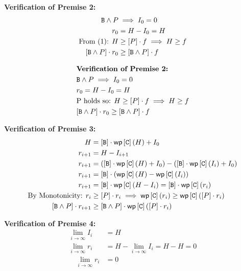 \documentclass[acmsmall,natbib,review,screen,anonymous,10pt]{acmart}
\begin{document}
\noindent\textbf{Verification of Premise 2:}
\begin{align*}
  \mathtt{B} \wedge P &\implies I_0 = 0 \\
  r_0 &= H - I_0 = H \\
  \text{From (1): } H &\geq [P] \cdot f \implies H \geq f \\
  \quad [\mathtt{B}\land P] \cdot r_0 &\geq [\mathtt{B}\land P] \cdot f
\end{align*}

$$\begin{aligned}
& \textbf{Verification of Premise 2:} \\
& \mathtt{B} \wedge P \implies I_0 = 0 \\
& r_0 = H - I_0 = H \\
& \text{P holds so: } H \ge [P] \cdot f \implies H \ge f \\
& [\mathtt{B} \wedge P] \cdot r_0 \ge [\mathtt{B} \wedge P] \cdot f
\end{aligned}$$

\noindent\textbf{Verification of Premise 3:}
\begin{align*}
  H &= [\mathtt{B}] \cdot \mathsf{wp}\left[{\mathtt{C}}\right]\left({H}\right) + I_0 \\
  r_{i+1} &= H - I_{i+1} \\
  r_{i+1} &= ([\mathtt{B}] \cdot \mathsf{wp}\left[{\mathtt{C}}\right]\left({H}\right) + I_0) - ([\mathtt{B}] \cdot \mathsf{wp}\left[{\mathtt{C}}\right]\left({I_i}\right) + I_0) \\
  r_{i+1} &= [\mathtt{B}] \cdot (\mathsf{wp}\left[{\mathtt{C}}\right]\left({H}\right) - \mathsf{wp}\left[{\mathtt{C}}\right]\left({I_i}\right)) \\
  r_{i+1} &= [\mathtt{B}] \cdot \mathsf{wp}\left[{\mathtt{C}}\right]\left({H - I_i}\right) = [\mathtt{B}] \cdot \mathsf{wp}\left[{\mathtt{C}}\right]\left({r_i}\right) \\
  \text{By Monotonicity: } r_i &\geq [P] \cdot r_i \implies \mathsf{wp}\left[{\mathtt{C}}\right]\left({r_i}\right) \geq \mathsf{wp}\left[{\mathtt{C}}\right]\left({[P] \cdot r_i}\right) \\
  \quad [\mathtt{B}\land P] \cdot r_{i+1} &\geq [\mathtt{B}\land P] \cdot \mathsf{wp}\left[{\mathtt{C}}\right]\left({[P] \cdot r_i}\right)
\end{align*}

\noindent\textbf{Verification of Premise 4:}
\begin{align*}
  \lim_{i \to \infty} I_i &= H \\
  \lim_{i \to \infty} r_i &= H - \lim_{i \to \infty} I_i = H - H = 0 \\
  \quad \lim_{i \to \infty} r_i &= 0
\end{align*}


\end{document}
